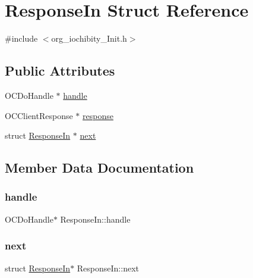\hypertarget{struct_response_in}{}\section{Response\+In Struct Reference}
\label{struct_response_in}


{\ttfamily \#include $<$org\+\_\+iochibity\+\_\+\+Init.\+h$>$}

\subsection*{Public Attributes}
\begin{DoxyCompactItemize}
\item 
O\+C\+Do\+Handle $\ast$ \hyperlink{struct_response_in_a8d3efb137906d870992869d1b963c912}{handle}
\item 
O\+C\+Client\+Response $\ast$ \hyperlink{struct_response_in_a7be6abf5b2ddd25305851bc4f5248755}{response}
\item 
struct \hyperlink{struct_response_in}{Response\+In} $\ast$ \hyperlink{struct_response_in_ab7e138399ed117c7381d419809a01a18}{next}
\end{DoxyCompactItemize}


\subsection{Member Data Documentation}
\hypertarget{struct_response_in_a8d3efb137906d870992869d1b963c912}{}\label{struct_response_in_a8d3efb137906d870992869d1b963c912} 
\subsubsection{\texorpdfstring{handle}{handle}}
{\footnotesize\ttfamily O\+C\+Do\+Handle$\ast$ Response\+In\+::handle}

\hypertarget{struct_response_in_ab7e138399ed117c7381d419809a01a18}{}\label{struct_response_in_ab7e138399ed117c7381d419809a01a18} 
\subsubsection{\texorpdfstring{next}{next}}
{\footnotesize\ttfamily struct \hyperlink{struct_response_in}{Response\+In}$\ast$ Response\+In\+::next}

